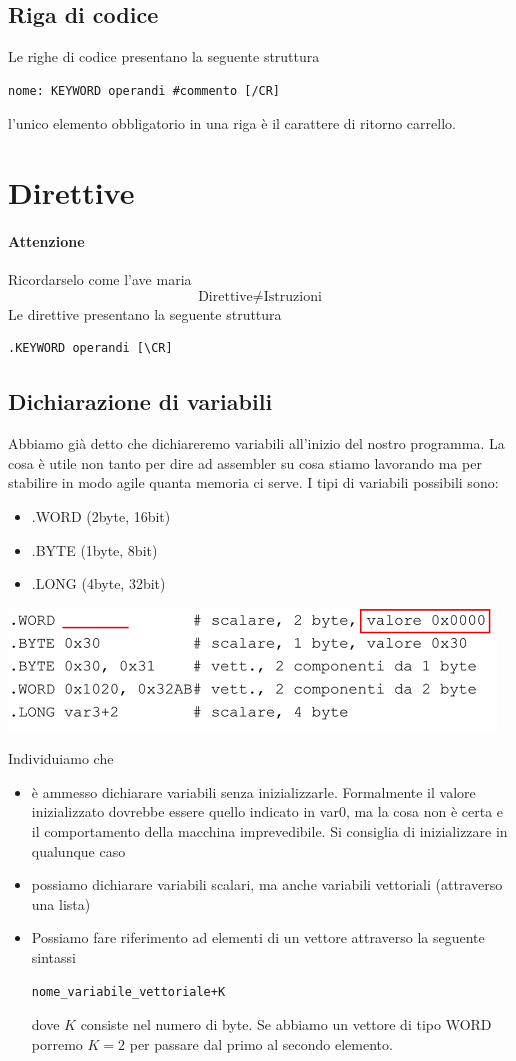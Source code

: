 \documentclass[11pt]{report}
\begin{document}
\subsection{Riga di codice}
Le righe di codice presentano la seguente struttura
\begin{verbatim}
nome: KEYWORD operandi #commento [/CR]
\end{verbatim}
l'unico elemento obbligatorio in una riga è il carattere di ritorno carrello.

\section{Direttive}
\paragraph{Attenzione} Ricordarselo come l'ave maria
\[\boxed{\text{Direttive} \neq \text{Istruzioni}}\]
Le direttive presentano la seguente struttura
\begin{verbatim}
.KEYWORD operandi [\CR]
\end{verbatim}
\subsection{Dichiarazione di variabili}
Abbiamo già detto che dichiareremo variabili all'inizio del nostro programma. La cosa è utile non tanto per dire ad assembler su cosa stiamo lavorando ma per stabilire in modo agile quanta memoria ci serve. I tipi di variabili possibili sono:
\begin{itemize}
\item .WORD (2byte, 16bit)
\item .BYTE (1byte, 8bit)
\item .LONG (4byte, 32bit)
\end{itemize}
\begin{center}
\includegraphics{img/49.PNG}
\end{center}
Individuiamo che
\begin{itemize}
\item è ammesso dichiarare variabili senza inizializzarle. Formalmente il valore inizializzato dovrebbe essere quello indicato in var0, ma la cosa non è certa e il comportamento della macchina imprevedibile. Si consiglia di inizializzare in qualunque caso
\item possiamo dichiarare variabili scalari, ma anche variabili vettoriali (attraverso una lista)
\item Possiamo fare riferimento ad elementi di un vettore attraverso la seguente sintassi
\begin{verbatim}
nome_variabile_vettoriale+K
\end{verbatim}
dove $K$ consiste nel numero di byte. Se abbiamo un vettore di tipo WORD porremo $K=2$ per passare dal primo al secondo elemento.
\end{itemize}
\end{document}
